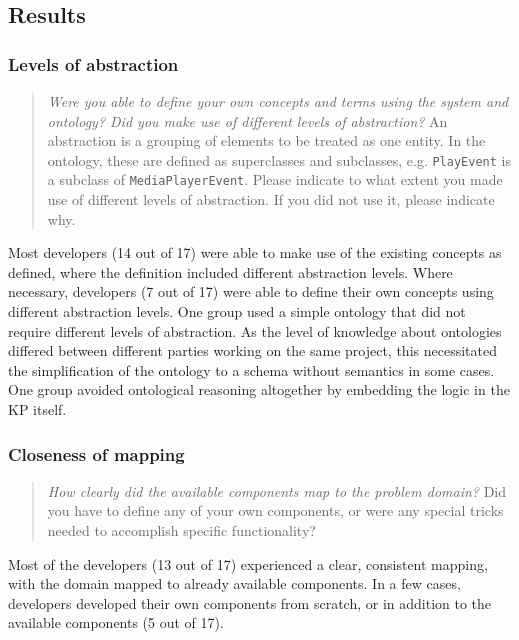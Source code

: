 \subsection{Results}

\subsubsection{Levels of abstraction}
\label{LevelsOfAbstraction}
\begin{quote}
	\emph{Were you able to define your own concepts and terms using the system and ontology? Did you make use of different levels of abstraction?} An abstraction is a grouping of elements to be treated as one entity. In the ontology, these are defined as superclasses and subclasses, e.g. \texttt{PlayEvent} is a subclass of \texttt{MediaPlayerEvent}. Please indicate to what extent you made use of different levels of abstraction. If you did not use it, please indicate why.
\end{quote}

Most developers (14 out of 17) were able to make use of the existing concepts as defined, where the definition included different abstraction levels. Where necessary, developers (7 out of 17) were able to define their own concepts using different abstraction levels. One group used a simple ontology that did not require different levels of abstraction. As the level of knowledge about ontologies differed between different parties working on the same project, this necessitated the simplification of the ontology to a schema without semantics in some cases. One group avoided ontological reasoning altogether by embedding the logic in the \ac{KP} itself.


\subsubsection{Closeness of mapping}
\label{resultsCloseness}

\begin{quote}
	\emph{How clearly did the available components map to the problem domain?}
	Did you have to define any of your own components, or were any special tricks needed to accomplish specific functionality?
\end{quote}


Most of the developers (13 out of 17) experienced a clear, consistent mapping, with the domain mapped to already available components. In a few cases, developers developed their own components from scratch, or in addition to the available components (5 out of 17).

